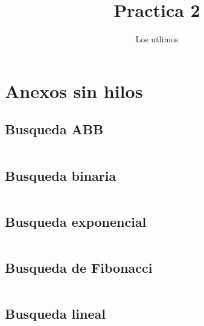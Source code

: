 \documentclass[12pt]{report}
\title{Practica 2}
\author{Los utlimos}
\begin{document}
\section*{Anexos sin hilos}
\subsection*{Busqueda ABB}
\inputminted{C}{babinario.c}
\newpage
\subsection*{Busqueda binaria}
\inputminted{C}{bbinaria.c}
\newpage
\subsection*{Busqueda exponencial}
\inputminted{C}{bexponencial.c}
\newpage
\subsection*{Busqueda de Fibonacci}
\inputminted{C}{bfibonacci.c}
\newpage
\subsection*{Busqueda lineal}
\inputminted{C}{blineal.c}
\end{document}
